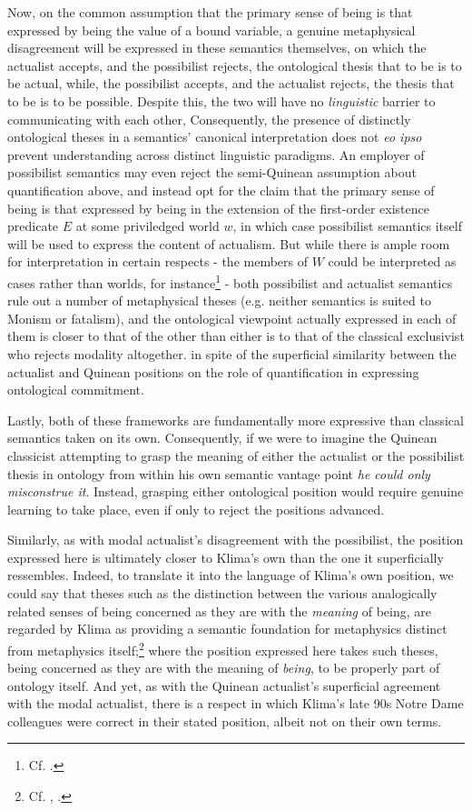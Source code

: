 \documentclass[]{article}
\begin{document}
Now, on the common assumption that the primary sense of being is that expressed by being the value of a bound variable, 
a genuine metaphysical disagreement will be expressed in these semantics themselves, 
on which the actualist accepts, 
and the possibilist rejects, 
the ontological thesis that to be is to be actual, 
while, the possibilist accepts, 
and the actualist rejects, 
the thesis that to be is to be possible. 
Despite this, the two will have no \emph{linguistic} barrier to communicating with each other, 
Consequently, the presence of distinctly ontological theses in a semantics' canonical interpretation does not 
\emph{eo ipso} prevent understanding across distinct linguistic paradigms.  
An employer of possibilist semantics may even reject the semi-Quinean assumption about quantification above, 
and instead opt for the claim 
that the primary sense of being is that expressed by being in the extension of the first-order existence predicate $E$ at some priviledged world $w$, 
in which case possibilist semantics itself will be used to express the content of actualism. 
But while there is ample room for interpretation in certain respects - 
the members of $W$ could be interpreted as cases rather than worlds, for instance\footnote{Cf. \autocite{CIFOL1,CIFOL2}.} - 
both possibilist and actualist semantics rule out a number of metaphysical theses 
(e.g. neither semantics is suited to Monism or fatalism), 
and the ontological viewpoint actually expressed in each of them is closer to that of the other than either is to that of the classical exclusivist who rejects modality altogether. 
in spite of the superficial similarity between the actualist and Quinean positions on the role of quantification in expressing ontological commitment. 

Lastly, both of these frameworks are fundamentally more expressive than classical semantics taken on its own.
Consequently, if we were to imagine the Quinean classicist attempting to grasp the meaning of either the actualist or the possibilist thesis in ontology 
from within his own semantic vantage point
\emph{he could only misconstrue it}.
Instead, grasping either ontological position would require genuine learning to take place, 
even if only to reject the positions advanced. 

Similarly, 
as with modal actualist's disagreement with the possibilist, 
the position expressed here is ultimately closer to Klima's own than the one it superficially ressembles.
Indeed, to translate it into the language of Klima's own position, 
we could say that theses such as the distinction between the various analogically related senses of being 
concerned as they are with the \emph{meaning} of being, 
are regarded by Klima as providing a semantic foundation for metaphysics distinct from metaphysics itself;\footnote{Cf. \autocite[88]{Klima1996}, \autocite[49]{Klima2011b}.}
where the position expressed here takes such theses, 
being concerned as they are with the meaning of \emph{being},
to be properly part of ontology itself. 
And yet, 
as with the Quinean actualist's superficial agreement with the modal actualist, 
there is a respect in which Klima's late 90s Notre Dame colleagues were correct in their stated position, 
albeit not on their own terms. 
\end{document}
